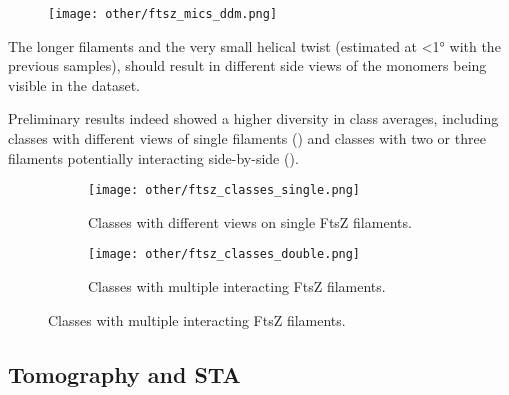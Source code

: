 \begin{figure}
    \centering
    \texttt{[image: other/ftsz\_mics\_ddm.png]}
    \label{fig:ftsz_ddm_mics}
\end{figure}

The longer filaments and the very small helical twist (estimated at <1° with the previous samples), should result in different side views of the monomers being visible in the dataset.

Preliminary results indeed showed a higher diversity in class averages, including classes with different views of single filaments () and classes with two or three filaments potentially interacting side-by-side ().

\begin{figure}
    \centering
    \begin{subfigure}[B]{.5\textwidth}
        \centering
        \texttt{[image: other/ftsz\_classes\_single.png]}
        \caption{Classes with different views on single FtsZ filaments.}
        \label{fig:ftsz_ddm_classes_single}
    \end{subfigure}%
    \hfill
    \begin{subfigure}[B]{.5\textwidth}
        \centering
        \texttt{[image: other/ftsz\_classes\_double.png]}
        \caption{Classes with multiple interacting FtsZ filaments.}
        \label{fig:ftsz_ddm_classes_double}
    \end{subfigure}%
    \label{fig:ftsz_ddm_classes}
\end{figure}

\subsection{Tomography and STA}

